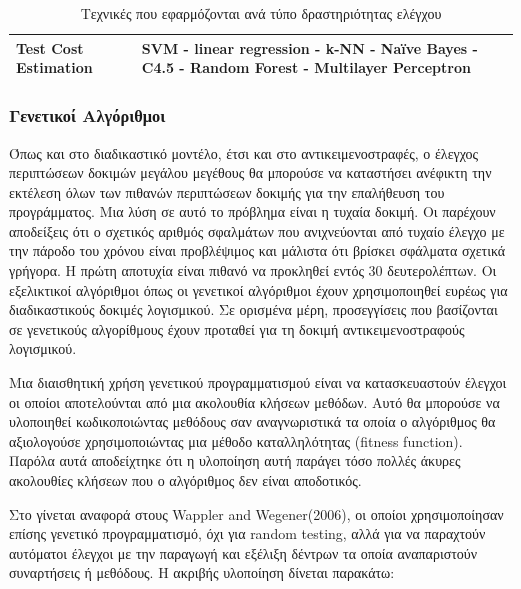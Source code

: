 \documentclass[12pt]{article}
\begin{document}
\begin{table}[]
\begin{tabular}{|p{5cm}|p{10cm}|}
Test Cost Estimation               & SVM - linear regression - k-NN - Naïve Bayes - C4.5 - Random Forest - Multilayer Perceptron                                                                                                                                                                                                            \\ \hline
\end{tabular}
\caption{Τεχνικές που εφαρμόζονται ανά τύπο δραστηριότητας ελέγχου}
\end{table}


\subsubsection{Γενετικοί Αλγόριθμοι}

Όπως και στο διαδικαστικό μοντέλο, έτσι και στο αντικειμενοστραφές, ο έλεγχος περιπτώσεων δοκιμών μεγάλου μεγέθους θα μπορούσε να καταστήσει ανέφικτη την εκτέλεση όλων των πιθανών περιπτώσεων δοκιμής για την επαλήθευση του προγράμματος. Μια λύση σε αυτό το πρόβλημα είναι η τυχαία δοκιμή. Οι \textcite{ciupa} παρέχουν αποδείξεις ότι ο σχετικός αριθμός σφαλμάτων που ανιχνεύονται από τυχαίο έλεγχο με την πάροδο του χρόνου είναι προβλέψιμος και μάλιστα ότι βρίσκει σφάλματα σχετικά γρήγορα. Η πρώτη αποτυχία είναι πιθανό να προκληθεί εντός 30 δευτερολέπτων. Οι εξελικτικοί αλγόριθμοι όπως οι γενετικοί αλγόριθμοι έχουν χρησιμοποιηθεί ευρέως για διαδικαστικούς δοκιμές λογισμικού. Σε ορισμένα μέρη, προσεγγίσεις που βασίζονται σε γενετικούς αλγορίθμους έχουν προταθεί για τη δοκιμή αντικειμενοστραφούς λογισμικού.

\par Μια διαισθητική χρήση γενετικού προγραμματισμού είναι να κατασκευαστούν έλεγχοι οι οποίοι αποτελούνται από μια ακολουθία κλήσεων μεθόδων. Αυτό θα μπορούσε να υλοποιηθεί κωδικοποιώντας μεθόδους σαν αναγνωριστικά τα οποία ο αλγόριθμος θα αξιολογούσε χρησιμοποιώντας μια μέθοδο καταλληλότητας (fitness function). Παρόλα αυτά αποδείχτηκε ότι η υλοποίηση αυτή παράγει τόσο πολλές άκυρες ακολουθίες κλήσεων που ο αλγόριθμος δεν είναι αποδοτικός.

\par Στο \textcite{meziane} γίνεται αναφορά στους Wappler and Wegener(2006), οι οποίοι χρησιμοποίησαν επίσης γενετικό προγραμματισμό, όχι για random testing, αλλά για να παραχτούν αυτόματοι έλεγχοι με την παραγωγή και εξέλιξη δέντρων τα οποία αναπαριστούν συναρτήσεις ή μεθόδους. Η ακριβής υλοποίηση δίνεται παρακάτω:
\end{document}
